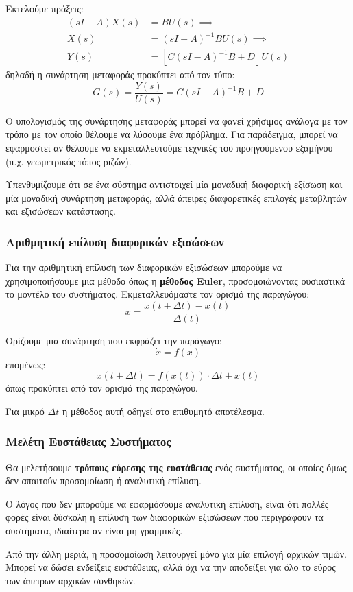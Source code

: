\documentclass[11pt,a4paper,notitlepage,fleqn,final]{article}
\begin{document}
Εκτελούμε πράξεις:
\begin{align*}
	(sI-A)X(s) &= BU(s) \implies \\
	X(s) &= (sI-A)^{-1} B U(s) \implies \\
	Y(s) &= \left[ C(sI-A)^{-1}B+D \right]U(s)
\end{align*}
δηλαδή η συνάρτηση μεταφοράς προκύπτει από τον τύπο:
\[
\boxed{
	G(s) = \frac{Y(s)}{U(s)} = C(sI-A)^{-1}B+D
	}
\]

Ο υπολογισμός της συνάρτησης μεταφοράς μπορεί να φανεί χρήσιμος ανάλογα με τον τρόπο με
τον οποίο θέλουμε να λύσουμε ένα πρόβλημα. Για παράδειγμα, μπορεί να εφαρμοστεί αν θέλουμε
να εκμεταλλευτούμε τεχνικές του προηγούμενου εξαμήνου (π.χ. γεωμετρικός τόπος ριζών).

Υπενθυμίζουμε ότι σε ένα σύστημα αντιστοιχεί μία μοναδική διαφορική εξίσωση και μία μοναδική
συνάρτηση μεταφοράς, αλλά άπειρες διαφορετικές επιλογές μεταβλητών και εξισώσεων κατάστασης.

\subsubsection{Αριθμητική επίλυση διαφορικών εξισώσεων}
Για την αριθμητική επίλυση των διαφορικών εξισώσεων μπορούμε να χρησιμοποιήσουμε μια μέθοδο
όπως η \textbf{μέθοδος Euler}, προσομοιώνοντας ουσιαστικά το μοντέλο του συστήματος.
Εκμεταλλευόμαστε τον ορισμό της παραγώγου:
\[
\dot x = \frac{x(t+\Delta t) - x(t)}{\Delta(t)}
\]

Ορίζουμε μια συνάρτηση που εκφράζει την παράγωγο:
\[
\dot x = f(x)
\]
επομένως:
\[
x(t+\Delta t) = f\left( x(t) \right) \cdot \Delta t + x(t)
\]
όπως προκύπτει από τον ορισμό της παραγώγου.

Για μικρό \( \Delta t \) η μέθοδος αυτή οδηγεί στο επιθυμητό αποτέλεσμα.

\subsubsection{Μελέτη Ευστάθειας Συστήματος}
Θα μελετήσουμε \textbf{τρόπους εύρεσης της ευστάθειας} ενός συστήματος, οι οποίες όμως δεν απαιτούν
προσομοίωση ή αναλυτική επίλυση.

Ο λόγος που δεν μπορούμε να εφαρμόσουμε αναλυτική επίλυση, είναι ότι πολλές φορές είναι
δύσκολη η επίλυση των διαφορικών εξισώσεων που περιγράφουν τα συστήματα, ιδιαίτερα αν είναι
μη γραμμικές.

Από την άλλη μεριά, η προσομοίωση λειτουργεί μόνο για μία επιλογή αρχικών τιμών. Μπορεί να
δώσει ενδείξεις ευστάθειας, αλλά όχι να την αποδείξει για όλο το εύρος των άπειρων αρχικών
συνθηκών.
\end{document}
